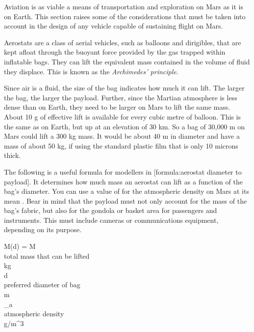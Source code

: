 

Aviation is as viable a means of transportation and exploration on Mars as it is on Earth. This section raises some of the considerations that must be taken into account in the design of any vehicle capable of sustaining flight on Mars.

Aerostats are a class of aerial vehicles, such as balloons and dirigibles, that are kept afloat through the buoyant force provided by the gas trapped within inflatable bags. They can lift the equivalent mass contained in the volume of fluid they displace. This is known as the {\it Archimedes' principle}. 

Since air is a fluid, the size of the bag indicates how much it can lift. The larger the bag, the larger the payload. Further, since the Martian atmosphere is less dense than on Earth, they need to be larger on Mars to lift the same mass. About 10 g of effective lift is available for every cubic metre of balloon. This is the same as on Earth, but up at an elevation of 30 km. So a bag of 30,000 m on Mars could lift a 300 kg mass. It would be about 40 m in diameter and have a mass of about 50 kg, if using the standard plastic film that is only 10 microns thick.

The following is a useful formula for modellers in [formula:aerostat diameter to payload]. It determines how much mass an aerostat can lift as a function of the bag's diameter. You can use a value of  for the atmospheric density on Mars at its mean . Bear in mind that the payload must not only account for the mass of the bag's fabric, but also for the gondola or basket area for passengers and instruments. This must include cameras or communications equipment, depending on its purpose.

\vfill
{}
\startformula
M(d) = 
\stopformula
\startlegend
\leg M \\ total mass that can be lifted \\ kg \\
\leg d \\ preferred diameter of bag \\ m \\
\leg {\rho}_a \\ atmospheric density \\ g/m^{3} \\
\stoplegend
\vfill

